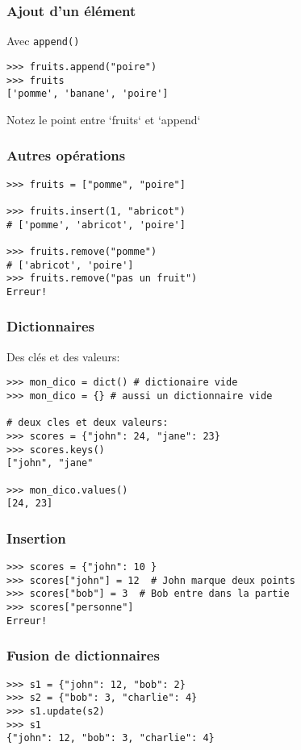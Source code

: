 \documentclass{beamer}
\begin{document}
\begin{frame}[fragile]
  \frametitle{Ajout d'un élément}
Avec \texttt{append()}

\begin{lstlisting}
>>> fruits.append("poire")
>>> fruits
['pomme', 'banane', 'poire']
\end{lstlisting}

\vfill

Notez le point entre `fruits` et `append`
\end{frame}


\begin{frame}[fragile]
  \frametitle{Autres opérations}

\begin{lstlisting}
>>> fruits = ["pomme", "poire"]

>>> fruits.insert(1, "abricot")
# ['pomme', 'abricot', 'poire']

>>> fruits.remove("pomme")
# ['abricot', 'poire']
>>> fruits.remove("pas un fruit")
Erreur!
\end{lstlisting}

\end{frame}



\begin{frame}[fragile]
  \frametitle{Dictionnaires}

Des clés et des valeurs:

\begin{lstlisting}
>>> mon_dico = dict() # dictionaire vide
>>> mon_dico = {} # aussi un dictionnaire vide

# deux cles et deux valeurs:
>>> scores = {"john": 24, "jane": 23}
>>> scores.keys()
["john", "jane"

>>> mon_dico.values()
[24, 23]
\end{lstlisting}

\end{frame}

\begin{frame}[fragile]
  \frametitle{Insertion}
\begin{lstlisting}
>>> scores = {"john": 10 }
>>> scores["john"] = 12  # John marque deux points
>>> scores["bob"] = 3  # Bob entre dans la partie
>>> scores["personne"]
Erreur!
\end{lstlisting}
\end{frame}

\begin{frame}[fragile]
  \frametitle{Fusion de dictionnaires}

\begin{lstlisting}
>>> s1 = {"john": 12, "bob": 2}
>>> s2 = {"bob": 3, "charlie": 4}
>>> s1.update(s2)
>>> s1
{"john": 12, "bob": 3, "charlie": 4}
\end{lstlisting}
\end{frame}
\end{document}
